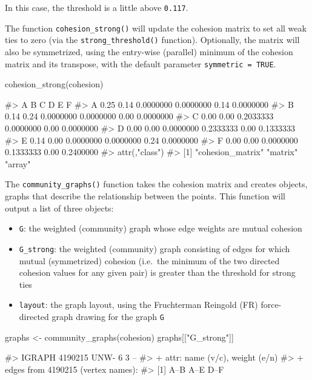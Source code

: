 In this case, the threshold is a little above \texttt{0.117}.

The function \texttt{cohesion\_strong()} will update the cohesion matrix
to set all weak ties to zero (via the \texttt{strong\_threshold()}
function). Optionally, the matrix will also be symmetrized, using the
entry-wise (parallel) minimum of the cohesion matrix and its transpose,
with the default parameter \texttt{symmetric\ =\ TRUE}.

\begin{Schunk}
\begin{Sinput}
cohesion_strong(cohesion)
\end{Sinput}
\begin{Soutput}
#>      A    B         C         D    E         F
#> A 0.25 0.14 0.0000000 0.0000000 0.14 0.0000000
#> B 0.14 0.24 0.0000000 0.0000000 0.00 0.0000000
#> C 0.00 0.00 0.2033333 0.0000000 0.00 0.0000000
#> D 0.00 0.00 0.0000000 0.2333333 0.00 0.1333333
#> E 0.14 0.00 0.0000000 0.0000000 0.24 0.0000000
#> F 0.00 0.00 0.0000000 0.1333333 0.00 0.2400000
#> attr(,"class")
#> [1] "cohesion_matrix" "matrix"          "array"
\end{Soutput}
\end{Schunk}

The \texttt{community\_graphs()} function takes the cohesion matrix and
creates  objects, graphs that describe the relationship
between the points. This function will output a list of three objects:

\begin{itemize}
\tightlist
\item
  \texttt{G}: the weighted (community) graph whose edge weights are
  mutual cohesion
\item
  \texttt{G\_strong}: the weighted (community) graph consisting of edges
  for which mutual (symmetrized) cohesion (i.e.~the minimum of the two
  directed cohesion values for any given pair) is greater than the
  threshold for strong ties
\item
  \texttt{layout}: the graph layout, using the Fruchterman Reingold (FR)
  force-directed graph drawing for the graph \texttt{G}
\end{itemize}

\begin{Schunk}
\begin{Sinput}
graphs <- community_graphs(cohesion)
graphs[["G_strong"]]
\end{Sinput}
\begin{Soutput}
#> IGRAPH 4190215 UNW- 6 3 -- 
#> + attr: name (v/c), weight (e/n)
#> + edges from 4190215 (vertex names):
#> [1] A--B A--E D--F
\end{Soutput}
\end{Schunk}

